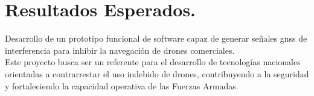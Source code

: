 \chapter*{Resultados Esperados.}

\begin{justify}
    Desarrollo de un prototipo funcional de software capaz de generar señales \gls{gnss} de interferencia para inhibir
    la navegación de drones comerciales.\\

    \noindent Este proyecto busca ser un referente para el desarrollo de tecnologías nacionales orientadas a contrarrestar
    el uso indebido de drones, contribuyendo a la seguridad y fortaleciendo la capacidad operativa de las Fuerzas Armadas.
\end{justify}